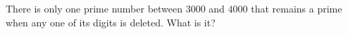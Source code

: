 There is only one prime number between $3000$ and $4000$ that remains a prime when any one of its digits is deleted. What is it?
